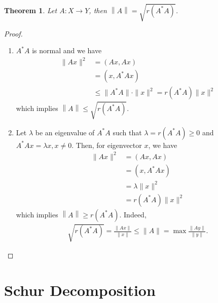 \documentclass[10pt]{book}
\newtheorem{theorem}{Theorem}[chapter]
\theoremstyle{definition}
\numberwithin{equation}{chapter}
\begin{document}
\medskip

\begin{theorem}
Let $A:X\to Y$, then $\left\|A\right\| = \sqrt{r(A^*A)}$.
\end{theorem}
\begin{proof}
~\begin{enumerate}[label=(\alph*)]
    \item $A^*A$ is normal and we have
    \begin{align*}
        \|Ax\|^2 & = (Ax, Ax) \\
        & = (x, A^*Ax) \\
        & \leq \|A^*A\|\cdot \|x\|^2 = r(A^*A) \|x\|^2
    \end{align*}
    which implies $\left\|A\right\| \leq \sqrt{r(A^*A)}$.
    \item Let $\lambda$ be an eigenvalue of $A^*A$ such that $\lambda = r(A^*A) \geq 0$ and $A^*Ax = \lambda x, x\neq 0$. Then, for eigenvector $x$, we have
    \begin{align*}
        \|Ax\|^2 & = (Ax,Ax) \\
        & = (x,A^*Ax) \\
        & = \lambda \|x\|^2 \\
        & = r(A^*A) \|x\|^2 
    \end{align*}
    which implies $\left\|A\right\| \geq r(A^*A)$. Indeed, 
    \begin{align*}
        \sqrt{r(A^*A)} = \frac{\|Ax\|}{\|x\|} \leq \|A\| = \max \frac{\|Ay\|}{\|y\|}.
    \end{align*}
\end{enumerate}
\end{proof}

\medskip

\section{Schur Decomposition}
\end{document}
